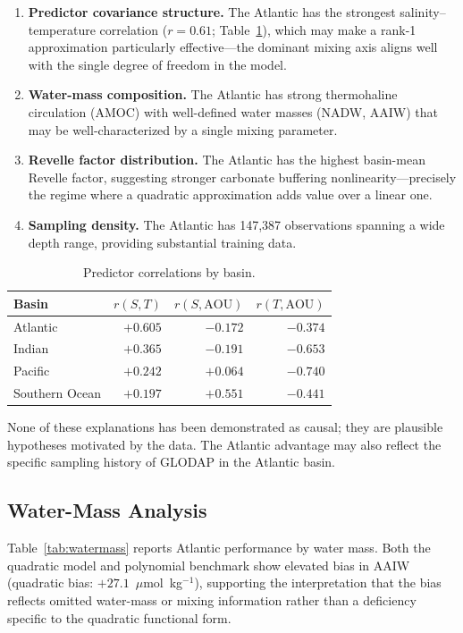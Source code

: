\documentclass[12pt,a4paper]{article}
\begin{document}
\begin{enumerate}[nosep]
    \item \textbf{Predictor covariance structure.} The Atlantic has the strongest salinity--temperature correlation ($r = 0.61$; Table~\ref{tab:correlations}), which may make a rank-1 approximation particularly effective---the dominant mixing axis aligns well with the single degree of freedom in the model.
    \item \textbf{Water-mass composition.} The Atlantic has strong thermohaline circulation (AMOC) with well-defined water masses (NADW, AAIW) that may be well-characterized by a single mixing parameter.
    \item \textbf{Revelle factor distribution.} The Atlantic has the highest basin-mean Revelle factor, suggesting stronger carbonate buffering nonlinearity---precisely the regime where a quadratic approximation adds value over a linear one.
    \item \textbf{Sampling density.} The Atlantic has 147{,}387 observations spanning a wide depth range, providing substantial training data.
\end{enumerate}

\begin{table}[htbp]
\centering
\caption{Predictor correlations by basin.}
\label{tab:correlations}
\begin{tabular}{lrrr}
\toprule
\textbf{Basin} & $r(S, T)$ & $r(S, \text{AOU})$ & $r(T, \text{AOU})$ \\
\midrule
Atlantic        & $+0.605$ & $-0.172$ & $-0.374$ \\
Indian          & $+0.365$ & $-0.191$ & $-0.653$ \\
Pacific         & $+0.242$ & $+0.064$ & $-0.740$ \\
Southern Ocean  & $+0.197$ & $+0.551$ & $-0.441$ \\
\bottomrule
\end{tabular}
\end{table}

None of these explanations has been demonstrated as causal; they are plausible hypotheses motivated by the data. The Atlantic advantage may also reflect the specific sampling history of GLODAP in the Atlantic basin.

\subsection{Water-Mass Analysis}
\label{sec:watermass_results}

Table~\ref{tab:watermass} reports Atlantic performance by water mass. Both the quadratic model and polynomial benchmark show elevated bias in AAIW (quadratic bias: $+27.1$~$\mu$mol~kg$^{-1}$), supporting the interpretation that the bias reflects omitted water-mass or mixing information rather than a deficiency specific to the quadratic functional form.
\end{document}
